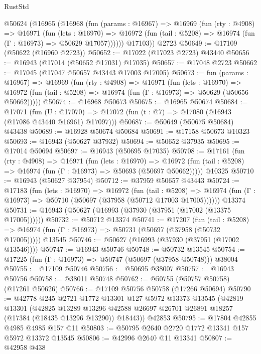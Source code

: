 \begin{lexlean}{RustStd}
\begin{coremodule}
    @50624
      (@16965
        (@16968
          (fun (params : @16967) =>
          @16969
            (fun (rty : @4908) =>
            @16971
              (fun (lets : @16970) =>
              @16972 (fun (tail : @5208) => @16974 (fun (Γ : @16973) => @50629 @17057))))))
        @17103))
    @2723
@50649 := @17109 (@50622 (@16960 @2723))
@50652 := @17022 (@17023 @2723) @43440
@50656 := @16943 (@17014 (@50652 @17031) @17035)
@50657 := @17048 @2723
@50662 := @17045 (@17047 @50657 @43443 @17003 @17005)
@50673 := fun (params : @16967) =>
  @16969
    (fun (rty : @4908) =>
    @16971
      (fun (lets : @16970) =>
      @16972 (fun (tail : @5208) => @16974 (fun (Γ : @16973) => @50629 (@50656 @50662)))))
@50674 := @16968 @50673
@50675 := @16965 @50674
@50684 := @17071
    (fun (U : @17070) => @17072 (fun (t : @7) => @17080 (@16943 (@17086 @43440 @16961) @17097)))
@50687 := @50649 (@50675 @50684) @43438
@50689 := @16928 @50674 @50684
@50691 := @17158 @50673 @10323
@50693 := @16943 (@50627 @37932)
@50694 := @50652 @37935
@50695 := @17014 @50694
@50697 := @16943 (@50695 @17035)
@50708 := @17161
    (fun (rty : @4908) =>
    @16971
      (fun (lets : @16970) =>
      @16972 (fun (tail : @5208) => @16974 (fun (Γ : @16973) => @50693 (@50697 @50662)))))
    @10325
@50710 := @16943 (@50627 @37954)
@50712 := @37959 @50657 @43443
@50724 := @17183
    (fun (lets : @16970) =>
    @16972
      (fun (tail : @5208) =>
      @16974 (fun (Γ : @16973) => @50710 (@50697 (@37958 (@50712 @17003 @17005))))))
    @13374
@50731 := @16943 (@50627 (@16993 (@37930 (@37951 (@17002 (@13375 @17005))))))
@50732 := @50712 @13374
@50741 := @17207
    (fun (tail : @5208) => @16974 (fun (Γ : @16973) => @50731 (@50697 (@37958 (@50732 @17005)))))
    @13545
@50746 := @50627 (@16993 (@37930 (@37951 (@17002 @13546))))
@50747 := @16943 @50746
@50748 := @50732 @13545
@50754 := @17225 (fun (Γ : @16973) => @50747 (@50697 (@37958 @50748))) @38004
@50755 := @17109 @50746
@50756 := @50695 @38007
@50757 := @16943 @50756
@50758 := @38011 @50748
@50762 := @50755 (@50757 @50758) (@17261 @50626)
@50766 := @17109 @50756 @50758 (@17266 @50694)
@50790 := @42778
    @245
    @2721
    @1772
    @13301
    @127
    @5972
    @13373
    @13545
    (@42819
      @13301
      (@42825
        @13289
        @13296
        @42588
        @26697
        @26701
        @26891
        @18257
        (@17384 (@18435 @13296 @13290))
        @18443))
    @42853
@50795 := @17804 @42855 @4985 @4985 @157 @11
@50803 := @50795 @2640 @2720 @1772 @13341 @157 @5972 @13372 @13545
@50806 := @42996 @2640 @11 @13341
@50807 := @42958 @438

\end{coremodule}
\end{lexlean}
